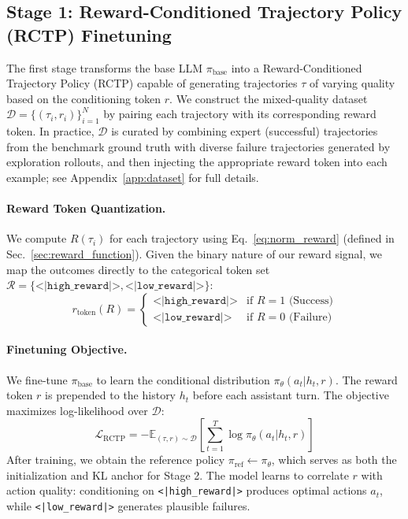 \documentclass{article}
\theoremstyle{plain}
\theoremstyle{definition}
\theoremstyle{remark}
\begin{document}
\subsection{Stage 1: Reward-Conditioned Trajectory Policy (RCTP) Finetuning}
\label{sec:stage1}
The first stage transforms the base LLM $\pi_{\text{base}}$ into a Reward-Conditioned Trajectory Policy (RCTP) capable of generating trajectories $\tau$ of varying quality based on the conditioning token $r$. We construct the mixed-quality dataset $\mathcal{D} = \{(\tau_i, r_i)\}_{i=1}^N$ by pairing each trajectory with its corresponding reward token. In practice, $\mathcal{D}$ is curated by combining expert (successful) trajectories from the benchmark ground truth with diverse failure trajectories generated by exploration rollouts, and then injecting the appropriate reward token into each example; see Appendix~\ref{app:dataset} for full details. \cite{bfcl2024}

\paragraph{Reward Token Quantization.}
We compute $R(\tau_i)$ for each trajectory using Eq.~\ref{eq:norm_reward} (defined in Sec.~\ref{sec:reward_function}). Given the binary nature of our reward signal, we map the outcomes directly to the categorical token set $\mathcal{R} = \{\texttt{<|high\_reward|>}, \texttt{<|low\_reward|>}\}$:
\begin{equation}
    r_{\text{token}}(R) = 
    \begin{cases} 
    \texttt{<|high\_reward|>} & \text{if } R = 1 \text{ (Success)} \\
    \texttt{<|low\_reward|>} & \text{if } R = 0 \text{ (Failure)}
    \end{cases}
\end{equation}

\paragraph{Finetuning Objective.}
We fine-tune $\pi_{\text{base}}$ to learn the conditional distribution $\pi_\theta(a_t | h_t, r)$. The reward token $r$ is prepended to the history $h_t$ before each assistant turn. The objective maximizes log-likelihood over $\mathcal{D}$:
\begin{equation}
    \mathcal{L}_{\text{RCTP}} = -\mathbb{E}_{(\tau,r)\sim\mathcal{D}} \left[ \sum_{t=1}^{T} \log \pi_\theta(a_t | h_t, r) \right]
\end{equation}
After training, we obtain the reference policy $\pi_{\text{ref}} \leftarrow \pi_\theta$, which serves as both the initialization and KL anchor for Stage 2. The model learns to correlate $r$ with action quality: conditioning on \texttt{<|high\_reward|>} produces optimal actions $a_t$, while \texttt{<|low\_reward|>} generates plausible failures.
\end{document}
